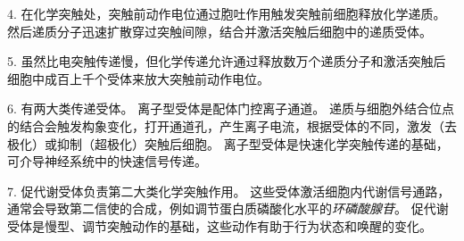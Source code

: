 4. 在化学突触处，突触前动作电位通过胞吐作用触发突触前细胞释放化学递质。
然后递质分子迅速扩散穿过突触间隙，结合并激活突触后细胞中的递质受体。


5. 虽然比电突触传递慢，但化学传递允许通过释放数万个递质分子和激活突触后细胞中成百上千个受体来放大突触前动作电位。


6. 有两大类传递受体。
离子型受体是配体门控离子通道。
递质与细胞外结合位点的结合会触发构象变化，打开通道孔，产生离子电流，根据受体的不同，激发（去极化）或抑制（超极化）突触后细胞。
离子型受体是快速化学突触传递的基础，可介导神经系统中的快速信号传递。


7. 促代谢受体负责第二大类化学突触作用。
这些受体激活细胞内代谢信号通路，通常会导致第二信使的合成，例如调节蛋白质磷酸化水平的\textit{环磷酸腺苷}。
促代谢受体是慢型、调节突触动作的基础，这些动作有助于行为状态和唤醒的变化。
